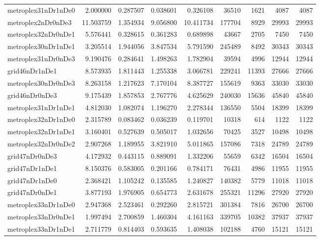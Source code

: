 \begin{longtable}{|l|r|r|r|r|r|r|r|r|}
metroplex31nDr1nDe0 & 2.000000 & 0.287507 & 0.038601 & 0.326108 & 36510 & 1621 & 4087 & 4087 \\
metroplex2nDr0nDe3 & 11.503759 & 1.354934 & 9.056800 & 10.411734 & 177704 & 8929 & 29993 & 29993 \\
metroplex32nDr0nDe1 & 5.576441 & 0.328615 & 0.361283 & 0.689898 & 43667 & 2705 & 7450 & 7450 \\
metroplex30nDr1nDe1 & 3.205514 & 1.944056 & 3.847534 & 5.791590 & 245489 & 8492 & 30343 & 30343 \\
metroplex31nDr0nDe3 & 9.190476 & 0.284641 & 1.498263 & 1.782904 & 39594 & 4996 & 12944 & 12944 \\
grid46nDr1nDe1 & 8.573935 & 1.811443 & 1.255338 & 3.066781 & 229241 & 11393 & 27666 & 27666 \\
metroplex30nDr0nDe3 & 8.263158 & 1.217623 & 7.170104 & 8.387727 & 155619 & 9363 & 33030 & 33030 \\
grid46nDr0nDe3 & 9.175439 & 1.857853 & 2.767776 & 4.625629 & 240030 & 15636 & 45840 & 45840 \\
metroplex31nDr1nDe1 & 4.812030 & 1.082074 & 1.196270 & 2.278344 & 136550 & 5504 & 18399 & 18399 \\
metroplex32nDr1nDe0 & 2.315789 & 0.083462 & 0.036239 & 0.119701 & 10318 & 614 & 1122 & 1122 \\
metroplex32nDr1nDe1 & 3.160401 & 0.527639 & 0.505017 & 1.032656 & 70425 & 3527 & 10498 & 10498 \\
metroplex32nDr0nDe2 & 2.907268 & 1.189955 & 3.821910 & 5.011865 & 157086 & 7318 & 24789 & 24789 \\
grid47nDr0nDe3 & 4.172932 & 0.443115 & 0.889091 & 1.332206 & 55659 & 6342 & 16504 & 16504 \\
grid47nDr1nDe1 & 8.150376 & 0.583005 & 0.201166 & 0.784171 & 76431 & 4986 & 11955 & 11955 \\
grid47nDr1nDe0 & 2.368421 & 1.105242 & 0.135585 & 1.240827 & 140382 & 5779 & 11018 & 11018 \\
grid47nDr0nDe1 & 3.877193 & 1.976905 & 0.654773 & 2.631678 & 255321 & 11296 & 27920 & 27920 \\
metroplex33nDr1nDe0 & 2.947368 & 2.523461 & 0.292260 & 2.815721 & 301384 & 7816 & 26700 & 26700 \\
metroplex33nDr0nDe1 & 1.997494 & 2.700859 & 1.460304 & 4.161163 & 339705 & 10382 & 37937 & 37937 \\
metroplex33nDr1nDe1 & 2.711779 & 0.814403 & 0.593635 & 1.408038 & 102188 & 4760 & 15121 & 15121 \\

\end{longtable}
